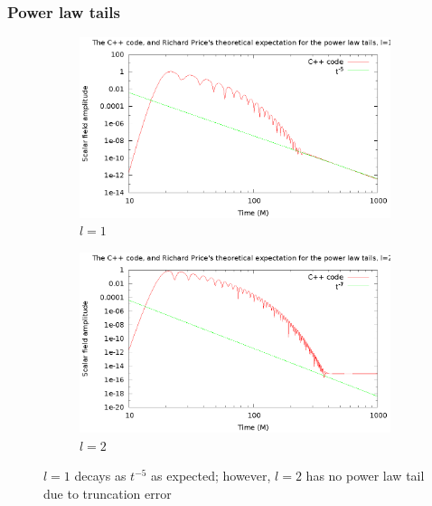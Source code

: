 \documentclass{beamer}
\begin{document}
\begin{frame}
  \frametitle{Power law tails}
  \begin{figure}
    \centering
    \begin{subfigure}{.45\textwidth}
      \centering
      \includegraphics[width=\textwidth]{l1m1tail2}
      \caption{$l=1$}
  \end{subfigure}
    \begin{subfigure}{.45\textwidth}
      \centering
      \includegraphics[width=\textwidth]{l2m2tailfail2}
      \caption{$l=2$}
    \end{subfigure}
  \caption{$l=1$ decays as $t^{-5}$ as expected; however, $l=2$ has no power law tail due to truncation error}
  \end{figure}
\end{frame}
\end{document}

